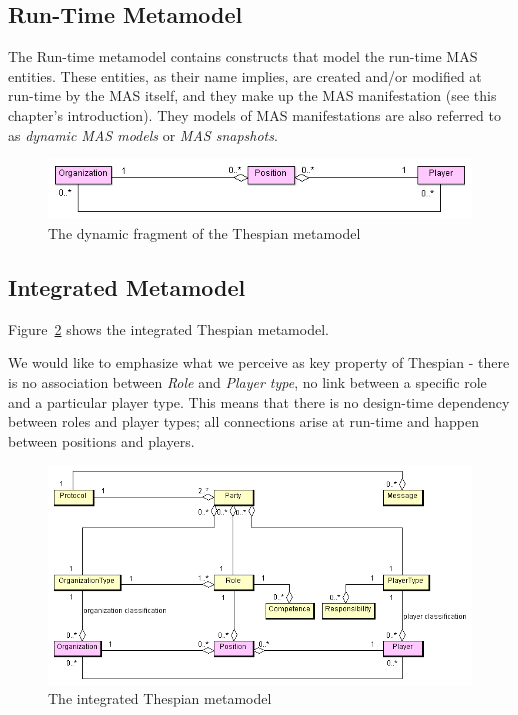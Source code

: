\subsection{Run-Time Metamodel}

The Run-time metamodel contains constructs that model the run-time MAS entities.
These entities, as their name implies, are created and/or modified at run-time by the MAS itself, and they make up the MAS manifestation (see this chapter's introduction).
They models of MAS manifestations are also referred to as \textit{dynamic MAS models} or \textit{MAS snapshots}.

\begin{figure}[ht]
	\centering
	\includegraphics[width=\textwidth]{images/thespian/run-time-metamodel.png}
	\caption{The dynamic fragment of the Thespian metamodel}
	\label{figure:thespian-dynamic-metamodel}
\end{figure}

\subsection{Integrated Metamodel}

Figure~\ref{figure:thespian-integrated-metamodel} shows the integrated Thespian metamodel.

We would like to emphasize what we perceive as key property of Thespian - there is no association between \textit{Role} and \textit{Player type}, no link between a specific role and a particular player type.
This means that there is no design-time dependency between roles and player types; all connections arise at run-time and happen between positions and players.

\begin{figure}[ht]
	\centering
	\includegraphics[width=\textwidth]{images/thespian/thespian-metamodel.png}
	\caption{The integrated Thespian metamodel}
	\label{figure:thespian-integrated-metamodel}
\end{figure}